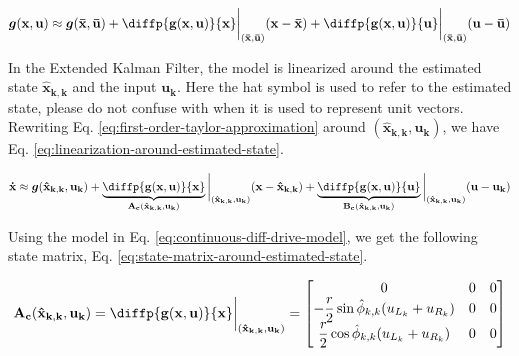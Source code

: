 \documentclass[12pt]{article}
\begin{document}
\begin{equation}
    \boldsymbol{g}(\mathbf{x}, \mathbf{u}) \approx \boldsymbol{g}(\mathbf{\bar{x}}, \mathbf{\bar{u}}) + \diffp{\mathbf{g}(\mathbf{x}, \mathbf{u})}{{\mathbf{x}}}\bigg\rvert_{(\mathbf{\bar{x}}, \mathbf{\bar{u}})} (\mathbf{x} - \mathbf{\bar{x}}) + \diffp{\mathbf{g}(\mathbf{x}, \mathbf{u})}{{\mathbf{u}}}\bigg\rvert_{(\mathbf{\bar{x}}, \mathbf{\bar{u}})} (\mathbf{u} - \mathbf{\bar{u}})
    \label{eq:first-order-taylor-approximation}
\end{equation}

In the Extended Kalman Filter, the model is linearized around the estimated state $\mathbf{\hat{x}_{k, k}}$ and the input $\mathbf{u_k}$. Here the hat symbol is used to refer to the estimated state, please do not confuse with when it is used to represent unit vectors. Rewriting Eq. \ref{eq:first-order-taylor-approximation} around $(\mathbf{\hat{x}_{k,k}}, \mathbf{u_k})$, we have Eq. \ref{eq:linearization-around-estimated-state}.

\begin{equation}
    \mathbf{\dot{x}} \approx \boldsymbol{g}(\mathbf{\hat{x}_{k, k}}, \mathbf{u_k}) + \underbrace{\diffp{\mathbf{g}(\mathbf{x}, \mathbf{u})}{{\mathbf{x}}}}_{\mathbf{A_c}(\mathbf{\hat{x}_{k, k}}, \mathbf{u_k})}\bigg\rvert_{(\mathbf{\hat{x}_{k, k}}, \mathbf{u_k})} (\mathbf{x} - \mathbf{\hat{x}_{k, k}}) + \underbrace{\diffp{\mathbf{g}(\mathbf{x}, \mathbf{u})}{{\mathbf{u}}}}_{\mathbf{B_c}(\mathbf{\hat{x}_{k, k}}, \mathbf{u_k})}\bigg\rvert_{(\mathbf{\hat{x}_{k, k}}, \mathbf{u_k})} (\mathbf{u} - \mathbf{u_k})
     \label{eq:linearization-around-estimated-state}
\end{equation}

Using the model in Eq. \ref{eq:continuous-diff-drive-model}, we get the following state matrix, Eq. \ref{eq:state-matrix-around-estimated-state}.

\renewcommand{\arraystretch}{1.5}
\begin{equation}
    \mathbf{A_c}(\mathbf{\hat{x}_{k, k}}, \mathbf{u_k}) = \diffp{\mathbf{g}(\mathbf{x}, \mathbf{u})}{{\mathbf{x}}}\bigg\rvert_{(\mathbf{\hat{x}_{k, k}}, \mathbf{u_k})} = \begin{bmatrix}
        0 & 0 & 0\\
        -\dfrac{r}{2}\sin\hat{\phi}_{k,k} (u_{L_k} + u_{R_k}) & 0 & 0\\
        \dfrac{r}{2}\cos\hat{\phi}_{k,k} (u_{L_k} + u_{R_k}) & 0 & 0\\
    \end{bmatrix}
    \label{eq:state-matrix-around-estimated-state}
\end{equation}
\end{document}
